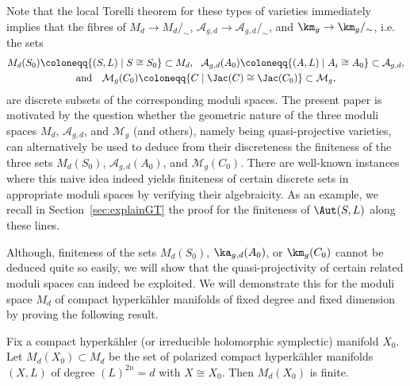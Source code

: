 Note that the local Torelli theorem for these types of varieties immediately implies that the fibres of $M_d\to M_d/_\sim$, ${\mathcal A}_{g,d}\to{\mathcal A}_{g,d}/_\sim$, and $\km_g\to\km_g/_\sim$, i.e. the sets
\begin{gather*}
M_d(S_0)\coloneqq\{(S,L)\mid S\cong S_0\}\subset{M}_d, \text{~~}{\mathcal A}_{g,d}(A_0)\coloneqq
\{(A,L)\mid A_i\cong A_0\}\subset{\mathcal A}_{g,d},\\
\text{and}\quad
{\mathcal M}_g(C_0)\coloneqq\{C\mid \Jac(C)\cong\Jac(C_0)\}\subset{\mathcal M}_g,
\end{gather*}
are discrete subsets of the corresponding moduli spaces. The present paper is motivated by the question whether the geometric nature of the three moduli spaces ${M}_d$, ${\mathcal A}_{g,d}$, and ${\mathcal M}_g$ (and others), namely being quasi-projective varieties, can alternatively be used to deduce from their discreteness the finiteness of the three sets $M_d(S_0)$, ${\mathcal A}_{g,d}(A_0)$, and ${\mathcal M}_{g}(C_0)$. There are well-known instances where this naive idea indeed yields finiteness of certain discrete sets in appropriate moduli spaces by verifying their algebraicity. As an example, we recall in Section~\ref{sec:explainGT} the proof for the finiteness of $\Aut(S,L)$ along these lines.

Although, finiteness of the sets $M_d(S_0)$, $\ka_{g,d}(A_0)$, or $\km_g(C_0)$ cannot be deduced quite so easily, we will show that the quasi-projectivity of certain related moduli spaces can indeed be exploited. We will demonstrate this for the moduli space $M_d$ of compact hyperk\"ahler manifolds of fixed degree and fixed dimension by proving the following result.

\begin{theo}\label{thm:HK}
Fix a compact hyperk\"ahler (or irreducible holomorphic symplectic) manifold $X_0$. Let $M_d(X_0)\subset {M}_{d}$ be the set of polarized compact hyperk\"ahler manifolds $(X,L)$ of degree $(L)^{2n}=d$ with $X\cong X_0$. Then $M_d(X_0)$ is finite.
\end{theo}


